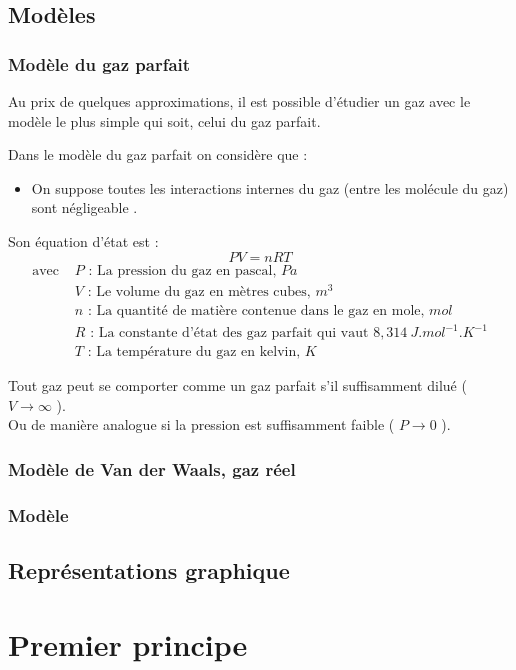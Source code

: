 \section{Modèles}
\subsection{Modèle du gaz parfait}
Au prix de quelques approximations, il est possible d'étudier un gaz avec le modèle le plus simple qui soit, celui du gaz parfait.
\begin{defi}
Dans le modèle du gaz parfait on considère que :
\begin{itemize}
    \item On suppose toutes les interactions internes du gaz (entre les molécule du gaz) sont négligeable .
\end{itemize}
\newline
Son équation d'état est :
$$PV=nRT$$
\begin{align*}
    \text{avec } & P\text{ : La pression du gaz en pascal, } Pa\\
    & V\text{ : Le volume du gaz en mètres cubes, } m^3\\
    & n\text{ : La quantité de matière contenue dans le gaz en mole, } mol\\
    & R\text{ : La constante d'état des gaz parfait qui vaut } 8,314\ J.mol^{-1}.K^{-1}\\
    & T\text{ : La température du gaz en kelvin, } K
\end{align*}
\end{defi}
\begin{rmq}
Tout gaz peut se comporter comme un gaz parfait s'il suffisamment dilué ( $V\to\infty$ ).\\ Ou de manière analogue si la pression est suffisamment faible ( $P\to 0$ ).
\end{rmq}
\subsection{Modèle de Van der Waals, gaz réel}
\subsection{Modèle}
\section{Représentations graphique}




\chapter{Premier principe}
